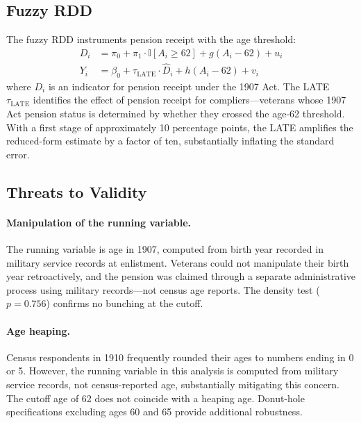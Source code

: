 \documentclass[12pt]{article}
\newcommand{\ind}{\mathbb{I}}
\begin{document}
\subsection{Fuzzy RDD}

The fuzzy RDD instruments pension receipt with the age threshold:
\begin{align}
D_i &= \pi_0 + \pi_1 \cdot \ind[A_i \geq 62] + g(A_i - 62) + u_i \\
Y_i &= \beta_0 + \tau_{\text{LATE}} \cdot \hat{D}_i + h(A_i - 62) + v_i
\end{align}
where $D_i$ is an indicator for pension receipt under the 1907 Act. The LATE $\tau_{\text{LATE}}$ identifies the effect of pension receipt for compliers---veterans whose 1907 Act pension status is determined by whether they crossed the age-62 threshold. With a first stage of approximately 10 percentage points, the LATE amplifies the reduced-form estimate by a factor of ten, substantially inflating the standard error.

\subsection{Threats to Validity}

\paragraph{Manipulation of the running variable.} The running variable is age in 1907, computed from birth year recorded in military service records at enlistment. Veterans could not manipulate their birth year retroactively, and the pension was claimed through a separate administrative process using military records---not census age reports. The density test ($p = 0.756$) confirms no bunching at the cutoff.

\paragraph{Age heaping.} Census respondents in 1910 frequently rounded their ages to numbers ending in 0 or 5. However, the running variable in this analysis is computed from military service records, not census-reported age, substantially mitigating this concern. The cutoff age of 62 does not coincide with a heaping age. Donut-hole specifications excluding ages 60 and 65 provide additional robustness.
\end{document}
